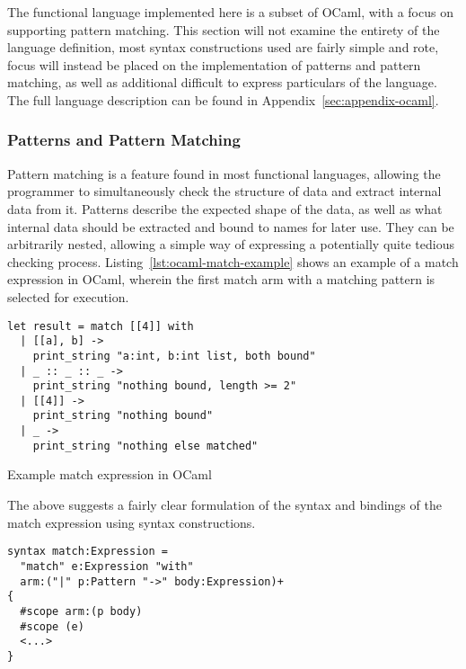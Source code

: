\documentclass{kththesis}
\begin{document}
The functional language implemented here is a subset of OCaml, with a focus on supporting pattern matching. This section will not examine the entirety of the language definition, most syntax constructions used are fairly simple and rote, focus will instead be placed on the implementation of patterns and pattern matching, as well as additional difficult to express particulars of the language. The full language description can be found in Appendix~\ref{sec:appendix-ocaml}.

\subsubsection{Patterns and Pattern Matching} \label{sec:functional-pattern-matching}


Pattern matching is a feature found in most functional languages, allowing the programmer to simultaneously check the structure of data and extract internal data from it. Patterns describe the expected shape of the data, as well as what internal data should be extracted and bound to names for later use. They can be arbitrarily nested, allowing a simple way of expressing a potentially quite tedious checking process. Listing~\ref{lst:ocaml-match-example} shows an example of a match expression in OCaml, wherein the first match arm with a matching pattern is selected for execution.

\begin{listing}[ht]
\begin{verbatim}
let result = match [[4]] with
  | [[a], b] ->
    print_string "a:int, b:int list, both bound"
  | _ :: _ :: _ ->
    print_string "nothing bound, length >= 2"
  | [[4]] ->
    print_string "nothing bound"
  | _ ->
    print_string "nothing else matched"
\end{verbatim}
\caption{Example match expression in OCaml}
\label{lst:ocaml-match-example}
\end{listing}

The above suggests a fairly clear formulation of the syntax and bindings of the match expression using syntax constructions.

\begin{verbatim}
syntax match:Expression =
  "match" e:Expression "with"
  arm:("|" p:Pattern "->" body:Expression)+
{
  #scope arm:(p body)
  #scope (e)
  <...>
}
\end{verbatim}
\end{document}
